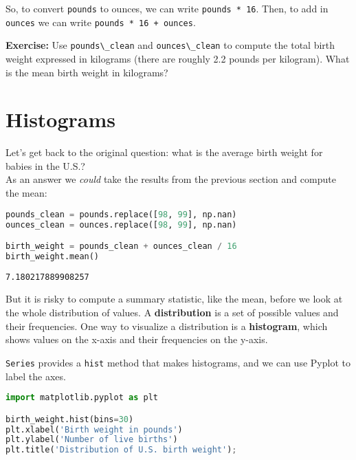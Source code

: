 So, to convert \passthrough{\lstinline!pounds!} to ounces, we can write
\passthrough{\lstinline!pounds * 16!}. Then, to add in
\passthrough{\lstinline!ounces!} we can write
\passthrough{\lstinline!pounds * 16 + ounces!}.

\textbf{Exercise:} Use \passthrough{\lstinline!pounds\_clean!} and
\passthrough{\lstinline!ounces\_clean!} to compute the total birth
weight expressed in kilograms (there are roughly 2.2 pounds per
kilogram). What is the mean birth weight in kilograms?

\section{Histograms}\label{histograms}

Let's get back to the original question: what is the average birth
weight for babies in the U.S.?\\
As an answer we \emph{could} take the results from the previous section
and compute the mean:

\begin{lstlisting}[language=Python,style=source]
pounds_clean = pounds.replace([98, 99], np.nan)
ounces_clean = ounces.replace([98, 99], np.nan)

birth_weight = pounds_clean + ounces_clean / 16
birth_weight.mean()
\end{lstlisting}

\begin{lstlisting}[style=output]
7.180217889908257
\end{lstlisting}

But it is risky to compute a summary statistic, like the mean, before we
look at the whole distribution of values. A \textbf{distribution} is a
set of possible values and their frequencies. One way to visualize a
distribution is a \textbf{histogram}, which shows values on the x-axis
and their frequencies on the y-axis.


\pagebreak

\passthrough{\lstinline!Series!}
provides a \passthrough{\lstinline!hist!} method that makes histograms,
and we can use Pyplot to label the axes.

\begin{lstlisting}[language=Python,style=source]
import matplotlib.pyplot as plt

birth_weight.hist(bins=30)
plt.xlabel('Birth weight in pounds')
plt.ylabel('Number of live births')
plt.title('Distribution of U.S. birth weight');
\end{lstlisting}

